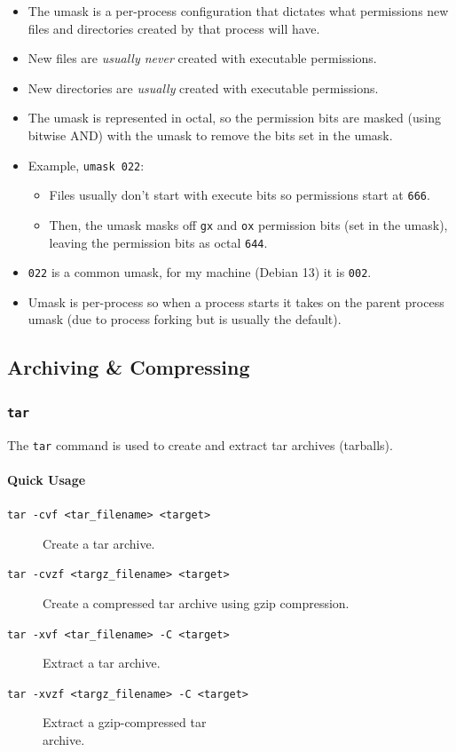 \documentclass{article}
\newcommand{\code}[1]{\texttt{#1}}
\begin{document}
\begin{itemize}
    \item The umask is a per-process configuration that dictates what permissions new files and directories created by that process will have.
    \item New files are \emph{usually never} created with executable permissions.
    \item New directories are \emph{usually} created with executable permissions.
    \item The umask is represented in octal, so the permission bits are masked (using bitwise AND) with the umask to remove the bits set in the umask.
    \item Example, \code{umask 022}:
    \begin{itemize}
        \item Files usually don't start with execute bits so permissions start at \code{666}.
        \item Then, the umask masks off \code{gx} and \code{ox} permission bits (set in the umask), leaving the permission bits as octal \code{644}.
    \end{itemize}
    \item \code{022} is a common umask, for my machine (Debian 13) it is \code{002}.
    \item Umask is per-process so when a process starts it takes on the parent process umask (due to process forking but is usually the default).
\end{itemize}

\subsection{Archiving \& Compressing}

\subsubsection{\code{tar}}

The \code{tar} command is used to create and extract tar archives (tarballs).

\paragraph{Quick Usage}

\begin{description}
    \item[\code{tar -cvf <tar\_filename> <target>}] Create a tar archive.
    \item[\code{tar -cvzf <targz\_filename> <target>}] Create a compressed tar archive using gzip compression.
    \item[\code{tar -xvf <tar\_filename> -C <target>}] Extract a tar archive.
    \item[\code{tar -xvzf <targz\_filename> -C <target>}] Extract a gzip-compressed tar \\archive.
\end{description}
\end{document}

